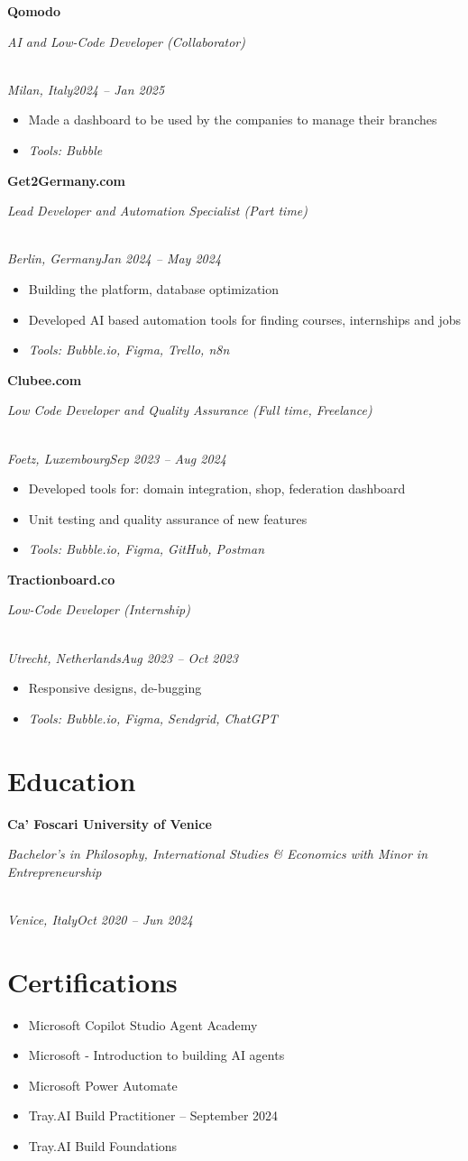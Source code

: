 \documentclass[a4paper,10pt]{article}
\newcommand{\role}[4]{\vspace{3pt}\noindent\hspace{0.6em}\parbox[t]{0.38\textwidth}{\raggedright\textbf{#1}}\hfill\parbox[t]{0.58\textwidth}{\raggedleft\textit{#2}}\\{\textit{#3}\hfill\textit{#4}}\vspace{1pt}}
\begin{document}
\role{Qomodo}{AI and Low-Code Developer (Collaborator)}{Milan, Italy}{2024 -- Jan 2025}
\begin{itemize}
\item Made a dashboard to be used by the companies to manage their branches
\item \textit{Tools: Bubble}
\end{itemize}

\role{Get2Germany.com}{Lead Developer and Automation Specialist (Part time)}{Berlin, Germany}{Jan 2024 -- May 2024}
\begin{itemize}
\item Building the platform, database optimization
\item Developed AI based automation tools for finding courses, internships and jobs
\item \textit{Tools: Bubble.io, Figma, Trello, n8n}
\end{itemize}

\role{Clubee.com}{Low Code Developer and Quality Assurance (Full time, Freelance)}{Foetz, Luxembourg}{Sep 2023 -- Aug 2024}
\begin{itemize}
\item Developed tools for: domain integration, shop, federation dashboard
\item Unit testing and quality assurance of new features
\item \textit{Tools: Bubble.io, Figma, GitHub, Postman}
\end{itemize}

\role{Tractionboard.co}{Low-Code Developer (Internship)}{Utrecht, Netherlands}{Aug 2023 -- Oct 2023}
\begin{itemize}
\item Responsive designs, de-bugging
\item \textit{Tools: Bubble.io, Figma, Sendgrid, ChatGPT}
\end{itemize}

\section{Education}
\role{Ca' Foscari University of Venice}{Bachelor's in Philosophy, International Studies \& Economics with Minor in Entrepreneurship}{Venice, Italy}{Oct 2020 -- Jun 2024}

\section{Certifications}
\begin{itemize}
\item Microsoft Copilot Studio Agent Academy
\item Microsoft - Introduction to building AI agents
\item Microsoft Power Automate
\item Tray.AI Build Practitioner -- September 2024
\item Tray.AI Build Foundations
\end{itemize}
\end{document}
